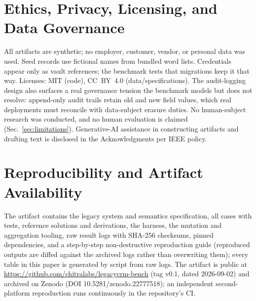 \documentclass{ieeetj}
\begin{document}
\section{Ethics, Privacy, Licensing, and Data Governance}
\label{sec:ethics}
All artifacts are synthetic; no employer, customer, vendor, or personal data was used. Seed
records use fictional names from bundled word lists. Credentials appear only as vault
references; the benchmark tests that migrations keep it that way. Licenses: MIT (code),
CC~BY~4.0 (data/specifications). The audit-logging design also surfaces a real governance
tension the benchmark models but does not resolve: append-only audit trails retain old and
new field values, which real deployments must reconcile with data-subject erasure duties.
No human-subject research was conducted, and no human evaluation is claimed
(Sec.~\ref{sec:limitations}). Generative-AI assistance in constructing artifacts and drafting
text is disclosed in the Acknowledgments per IEEE policy.

\section{Reproducibility and Artifact Availability}
\label{sec:repro}
The artifact contains the legacy system and semantics specification, all cases with tests,
reference solutions and derivations, the harness, the mutation and aggregation tooling, raw
result logs with SHA-256 checksums, pinned dependencies, and a step-by-step non-destructive
reproduction guide (reproduced outputs are diffed against the archived logs rather than
overwriting them); every table in this paper is generated by script from raw logs.
The artifact is public at \url{https://github.com/chitralabs/legacycrm-bench} (tag v0.1, dated 2026-09-02) and archived on
Zenodo (DOI 10.5281/zenodo.22777518); an independent second-platform reproduction runs continuously in the
repository's CI.
\end{document}
